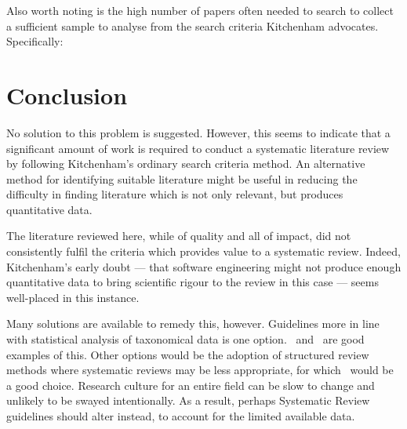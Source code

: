 Also worth noting is the high number of papers often needed to search to collect a sufficient sample to analyse from the search criteria Kitchenham advocates. Specifically:

\begin{table}[h]
\centering
{}
\caption{Papers reviewed to achieve desired samples}
\end{table}
\section{Conclusion}

No solution to this problem is suggested. However, this seems to indicate that a significant amount of work is required to conduct a systematic literature review by following Kitchenham's ordinary search criteria method. An alternative method for identifying suitable literature might be useful in reducing the difficulty in finding literature which is not only relevant, but produces quantitative data.\par

The literature reviewed here, while of quality and all of impact, did not consistently fulfil the criteria which provides value to a systematic review. Indeed, Kitchenham's early doubt --- that software engineering might not produce enough quantitative data to bring scientific rigour to the review in this case --- seems well-placed in this instance.\par

Many solutions are available to remedy this, however. Guidelines more in line with statistical analysis of taxonomical data is one option.~\cite{Kitchenham2013} and~\cite{Kampenes2007} are good examples of this. Other options would be the adoption of structured review methods where systematic reviews may be less appropriate, for which~\cite{Webster2002} would be a good choice. Research culture for an entire field can be slow to change and unlikely to be swayed intentionally. As a result, perhaps Systematic Review guidelines should alter instead, to account for the limited available data.\par

